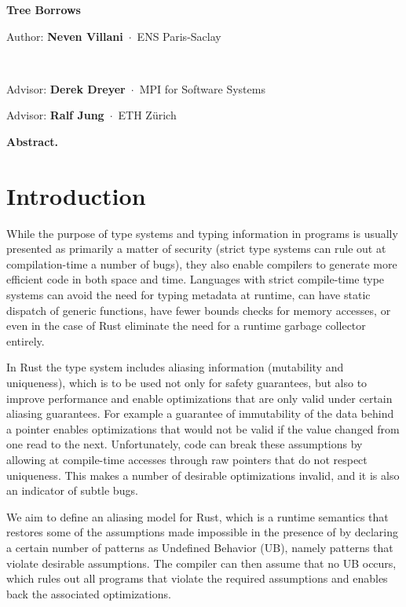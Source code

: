 \documentclass[a4paper,11pt]{article}
\newcommand{\myaff}[1]{\,$\cdot$\, {\small #1}\par\smallskip}
\newcommand{\fakeparagraph}[2]{\par\noindent\textbf{#1}\hspace{1em}#2}
\theoremstyle{plain}
\theoremstyle{definition}
\theoremstyle{remark}
\newcommand{\tcode}[1]{\rstinline{#1}}
\newenvironment{myabstract}
{\list{}{\listparindent 1.5em%
        \itemindent    \listparindent
        \leftmargin    0cm
        \rightmargin   0cm
        \parsep        0pt}%
    \item\relax}
{\endlist}
\newenvironment{mycover}
{\list{}{\listparindent 0pt
        \itemindent    \listparindent
        \leftmargin    0cm
        \rightmargin   0cm
        \parsep        0pt}%
    \raggedright
    \item\relax}
{\endlist}
\begin{document}
\begin{mycover}
{\huge\bfseries\boldmath Tree Borrows\par}
\bigskip
\bigskip
\bigskip


Author: \textbf{Neven Villani}
\myaff{ENS Paris-Saclay}

~\newline

Advisor: \textbf{Derek Dreyer}
\myaff{MPI for Software Systems}


Advisor: \textbf{Ralf Jung}
\myaff{ETH Zürich}


\end{mycover}
\medskip

\begin{myabstract}
\fakeparagraph{Abstract.}
\end{myabstract}
\medskip


\section{Introduction}

While the purpose of type systems and typing information in programs is usually
presented as primarily a matter of security (strict type systems can rule out
at compilation-time a number of bugs), they also enable compilers to generate
more efficient code in both space and time. Languages with strict compile-time
type systems can avoid the need for typing metadata at runtime, can have static
dispatch of generic functions, have fewer bounds checks for memory accesses,
or even in the case of Rust eliminate the need for a runtime garbage collector entirely.

In Rust the type system includes aliasing information (mutability and uniqueness),
which is to be used not only for safety guarantees, but also to improve
performance and enable optimizations that are only valid under certain aliasing
guarantees. For example a guarantee of immutability of the data behind a pointer
enables optimizations that would not be valid if the value changed from one read
to the next.
Unfortunately, \tcode{unsafe} code can break these assumptions by allowing at
compile-time accesses through raw pointers that do not respect uniqueness.
This makes a number of desirable optimizations invalid, and it is also an
indicator of subtle bugs.

We aim to define an aliasing model for Rust, which is a runtime semantics
that restores some of the assumptions made impossible in the presence of \tcode{unsafe}
by declaring a certain number of patterns as Undefined Behavior (UB), namely
patterns that violate desirable assumptions. The compiler can then assume
that no UB occurs, which rules out all programs that violate the required
assumptions and enables back the associated optimizations.
\end{document}
